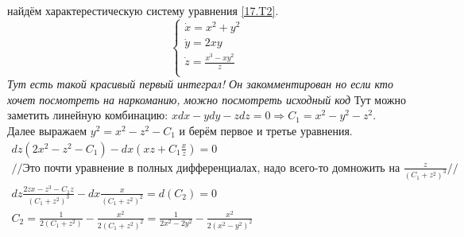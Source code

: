 \documentclass{article}
\begin{document}
найдём характерестическую систему уравнения \ref{17.T2}.
\begin{equation*}
    \begin{cases}
        \dot x =x^2+y^2 \\
        \dot y = 2xy\\
        \dot z = \frac{x^3-xy^2}{z}\\
    \end{cases}
\end{equation*}
 \textcolor[rgb]{0.480469,0.566406,0.480469}{\textit{Тут есть такой красивый первый интеграл! Он закомментирован но если кто хочет посмотреть на наркоманию, можно посмотреть исходный код}}                                                                                          
 Тут можно заметить линейную комбинацию: $x dx  - y dy - z dz =0 \Rightarrow C_1 =  x^2-y^2-z^2$. Далее выражаем $y^2=x^2-z^2-C_1$ и берём первое и третье уравнения.
 \begin{gather*}
     dz(2x^2-z^2-C_1)-dx\left(xz+C_1 \frac{x}{z} \right)=0\\
     //\text{Это почти уравнение в полных дифференциалах, надо всего-то домножить на } \frac{z}{(C_1+z^2)^3}//\\
     dz \frac{2zx-z^3-C_1z}{(C_1+z^2)^3} - dx \frac{x}{(C_1+z^2)^2}=d(C_2)=0\\
     C_2=\frac{1}{2 \left(C_1+z^2\right)}-\frac{x^2}{2 \left(C_1+z^2\right)^2} = \frac{1}{2x^2-2y^2} - \frac{x^2}{2 \left(x^2-y^2\right)^2}
 \end{gather*}
\end{document}
